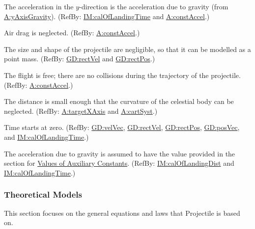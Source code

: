 \documentclass[12pt]{article}
\begin{document}
\begin{description}[font=\normalfont]
\item[accelYGravity:\phantomsection\label{accelYGravity}]{The acceleration in the $y$-direction is the acceleration due to gravity (from \hyperref[yAxisGravity]{A:yAxisGravity}). (RefBy: \hyperref[IM:calOfLandingTime]{IM:calOfLandingTime} and \hyperref[constAccel]{A:constAccel}.)}
\item[neglectDrag:\phantomsection\label{neglectDrag}]{Air drag is neglected. (RefBy: \hyperref[constAccel]{A:constAccel}.)}
\item[pointMass:\phantomsection\label{pointMass}]{The size and shape of the projectile are negligible, so that it can be modelled as a point mass. (RefBy: \hyperref[GD:rectVel]{GD:rectVel} and \hyperref[GD:rectPos]{GD:rectPos}.)}
\item[freeFlight:\phantomsection\label{freeFlight}]{The flight is free; there are no collisions during the trajectory of the projectile. (RefBy: \hyperref[constAccel]{A:constAccel}.)}
\item[neglectCurv:\phantomsection\label{neglectCurv}]{The distance is small enough that the curvature of the celestial body can be neglected. (RefBy: \hyperref[targetXAxis]{A:targetXAxis} and \hyperref[cartSyst]{A:cartSyst}.)}
\item[timeStartZero:\phantomsection\label{timeStartZero}]{Time starts at zero. (RefBy: \hyperref[GD:velVec]{GD:velVec}, \hyperref[GD:rectVel]{GD:rectVel}, \hyperref[GD:rectPos]{GD:rectPos}, \hyperref[GD:posVec]{GD:posVec}, and \hyperref[IM:calOfLandingTime]{IM:calOfLandingTime}.)}
\item[gravAccelValue:\phantomsection\label{gravAccelValue}]{The acceleration due to gravity is assumed to have the value provided in the section for \hyperref[Sec:AuxConstants]{Values of Auxiliary Constants}. (RefBy: \hyperref[IM:calOfLandingDist]{IM:calOfLandingDist} and \hyperref[IM:calOfLandingTime]{IM:calOfLandingTime}.)}
\end{description}
\subsubsection{Theoretical Models}
\label{Sec:TMs}
This section focuses on the general equations and laws that Projectile is based on.
\end{document}
